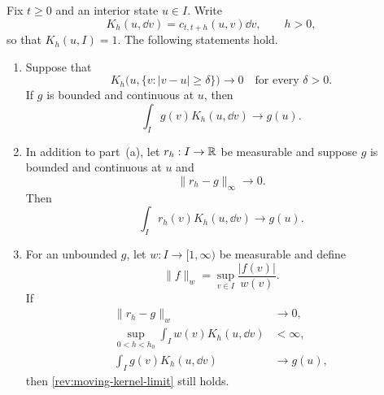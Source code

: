 \begin{lemma}
\label{rev:app-kernel-lemma}
Fix $t\ge0$ and an interior state $u\in I$.  Write
\[
K_h(u,\dd v)=c_{t,t+h}(u,v)\dd v,
\qquad h>0,
\]
so that $K_h(u,I)=1$.  The following statements hold.
\begin{enumerate}[label=(\alph*)]
\item Suppose that
\begin{equation}
K_h\bigl(u,\{v:|v-u|\ge\delta\}\bigr)\longrightarrow0
\quad\text{for every }\delta>0.
\label{rev:kernel-stochastic-continuity}
\end{equation}
If $g$ is bounded and continuous at $u$, then
\begin{equation}
\int_Ig(v)K_h(u,\dd v)\longrightarrow g(u).
\label{rev:kernel-fixed-function-limit}
\end{equation}
\item In addition to part~(a), let $r_h:I\to\mathbb R$ be measurable and suppose
$g$ is bounded and continuous at $u$ and
\begin{equation}
\lVert r_h-g\rVert_\infty\longrightarrow0.
\label{rev:moving-uniform-limit}
\end{equation}
Then
\begin{equation}
\int_Ir_h(v)K_h(u,\dd v)\longrightarrow g(u).
\label{rev:moving-kernel-limit}
\end{equation}
\item For an unbounded $g$, let $w:I\to[1,\infty)$ be measurable and define
\[
\lVert f\rVert_w=\sup_{v\in I}\frac{|f(v)|}{w(v)}.
\]
If
\begin{align}
\lVert r_h-g\rVert_w&\longrightarrow0,
\label{rev:moving-weighted-limit}\\
\sup_{0<h<h_0}\int_Iw(v)K_h(u,\dd v)&<\infty,
\label{rev:kernel-weight-bound}\\
\int_Ig(v)K_h(u,\dd v)&\longrightarrow g(u),
\label{rev:weighted-strong-continuity}
\end{align}
then \eqref{rev:moving-kernel-limit} still holds.
\end{enumerate}
\end{lemma}

